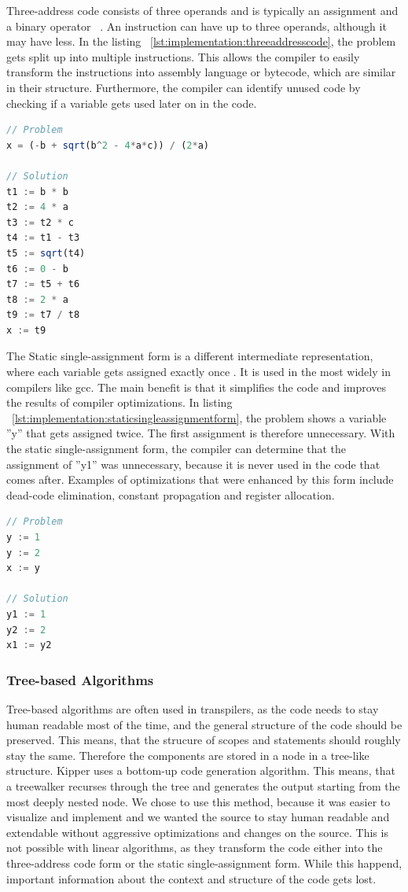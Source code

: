 Three-address code consists of three operands and is typically an assignment and a binary operator ~\cite{wiki:threeaddress}. An instruction can have up to three operands, although it may have less. In the listing ~\ref{lst:implementation:threeaddresscode}, the problem gets split up into multiple instructions. This allows the compiler to easily transform the instructions into assembly language or bytecode, which are similar in their structure. Furthermore, the compiler can identify unused code by checking if a variable gets used later on in the code.
\begin{lstlisting}[language=TypeScript,caption=Three-address code,label=lst:implementation:threeaddresscode]
// Problem
x = (-b + sqrt(b^2 - 4*a*c)) / (2*a)

// Solution
t1 := b * b
t2 := 4 * a
t3 := t2 * c
t4 := t1 - t3
t5 := sqrt(t4)
t6 := 0 - b
t7 := t5 + t6
t8 := 2 * a
t9 := t7 / t8
x := t9
\end{lstlisting}

The Static single-assignment form is a different intermediate representation, where each variable gets assigned exactly once \cite{wiki:singlestatic}. It is used in the most widely in compilers like \acrshort{gcc}. The main benefit is that it simplifies the code and improves the results of compiler optimizations. In listing ~\ref{lst:implementation:staticsingleassignmentform}, the problem shows a variable ''y'' that gets assigned twice. The first assignment is therefore unnecessary. With the static single-assignment form, the compiler can determine that the assignment of ''y1'' was unnecessary, because it is never used in the code that comes after. Examples of optimizations that were enhanced by this form include dead-code elimination, constant propagation and register allocation.
\begin{lstlisting}[language=TypeScript,caption=Static single-assignment form,label=lst:implementation:staticsingleassignmentform]
// Problem
y := 1
y := 2
x := y

// Solution
y1 := 1
y2 := 2
x1 := y2
\end{lstlisting}

\subsubsection{Tree-based Algorithms}
Tree-based algorithms are often used in transpilers, as the code needs to stay human readable most of the time, and the general structure of the code should be preserved. This means, that the strucure of scopes and statements should roughly stay the same. Therefore the components are stored in a node in a tree-like structure. Kipper uses a bottom-up code generation algorithm. This means, that a treewalker recurses through the tree and generates the output starting from the most deeply nested node. We chose to use this method, because it was easier to visualize and implement and we wanted the source to stay human readable and extendable without aggressive optimizations and changes on the source. This is not possible with linear algorithms, as they transform the code either into the three-address code form or the static single-assignment form. While this happend, important information about the context and structure of the code gets lost.

